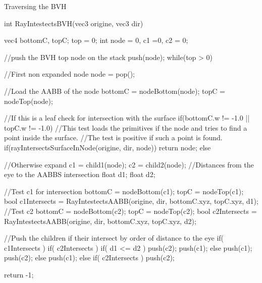 \documentclass[11pt,a4paper,english]{article}
\begin{document}
\begin{algorithm}                      %
\caption{Traversing the BVH}          %
\label{travers}                           %
\begin{minipage}{0.9\textwidth}%
\tiny
\CPP
int RayIntestectsBVH(vec3 origine, vec3 dir){
	vec4 bottomC, topC;
	top = 0;
	int node = 0, c1 =0, c2 = 0;
	
	//push the BVH top node on the stack	
	push(node);
	while(top > 0){
		//First non expanded node
		node = pop();
		
		//Load the AABB of the node
		bottomC = nodeBottom(node);
		topC = nodeTop(node);
		
		//If this is a leaf check for intersection with the surface
		if(bottomC.w != -1.0 || topC.w != -1.0){
			//This test loads the primitives if the node and tries to find a point inside the surface.
			//The test is positive if such a point is found.
			if(rayIntersectsSurfaceInNode(origine, dir, node)) return node;
		}else{
			//Otherwise expand
			c1 = child1(node);
			c2 = child2(node);
			//Distances from the eye to the AABBS intersection
			float d1;
			float d2;
			
			//Test c1 for intersection
			bottomC = nodeBottom(c1);
			topC = nodeTop(c1);
			bool c1Intersects = RayIntestectsAABB(origine, dir, bottomC.xyz, topC.xyz, d1);
			//Test c2
			bottomC = nodeBottom(c2);
			topC = nodeTop(c2);
			bool c2Intersects = RayIntestectsAABB(origine, dir, bottomC.xyz, topC.xyz, d2);
			
			//Push the children if their intersect by order of distance to the eye
			if( c1Intersects ){
				if( c2Intersects ){
					if( d1 <= d2 ){
						push(c2);
						push(c1);
					}else{
						push(c1);
						push(c2);
					}
				}else
					push(c1);
			}else if( c2Intersects )
				push(c2);
		}
	}
	return -1;
}
\END\PROGb{}

\end{minipage}%
\end{algorithm}
\end{document}

